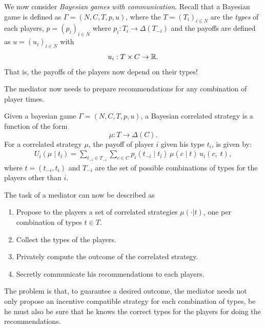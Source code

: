 We now consider \emph{Bayesian games with communication}. Recall that a Bayesian game is defined as $\Gamma = (N,C,T,p,u)$, where the $T = (T_i)_{i \in N}$ are the \emph{types} of each players,
$p = (p_{i})_{i \in N}$ where $p_i : T_i \rightarrow \Delta(T_{-i})$ and the payoffs are defined as $u = (u_i)_{i \in N}$ with
$$u _i : T \times C \rightarrow \mathbb{R}. $$
That is, the payoffs of the players now depend on their types!

The mediator now needs to prepare recommendations for any combination of player times.
\begin{definition}
Given a bayesian game $\Gamma = (N,C,T,p,u)$, a Bayesian correlated strategy is a function of the form
$$ \mu : T \rightarrow \Delta(C).$$
For a correlated strategy $\mu$, the payoff of player $i$ given his type $t_i$, is given by:
\begin{align*}
	U_i(\mu \; | \; t_i) = \sum_{t_{-i} \in T_{-i}} \sum_{c \in C} p_i(t_{-i} \; | \; t_i) \, \mu(c \; | \; t) \, u_i(c, \; t),
\end{align*}
where $t = (t_{-i}, t_i)$ and $T_{-i}$ are the set of possible combinations of types for the  players other than $i$.
\end{definition}

The task of a mediator can now be described as
\begin{enumerate}
\item Propose to the players a set of correlated strategies $\mu(\cdot | t)$, one per combination of types $t \in T$.
\item Collect the types of the players.
\item Privately compute the outcome of the correlated strategy.
\item Secretly communicate his recommendations to each players.
\end{enumerate}






The problem is that,  to guarantee a desired outcome, the mediator needs not only propose an incentive compatible strategy for each combination  of types, be he must also be sure that he knows the correct types for the players for doing the recommendations.

